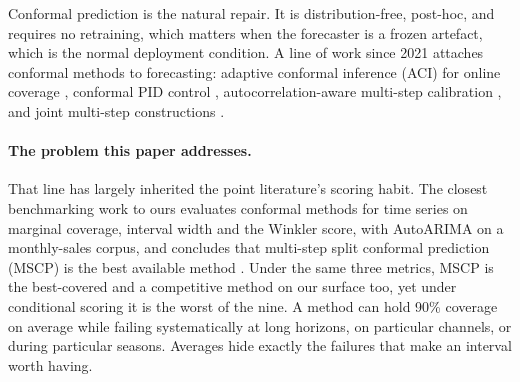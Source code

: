 \documentclass[11pt]{article}
\begin{document}
Conformal prediction is the natural repair. It is distribution-free, post-hoc, and requires no retraining, which matters when the forecaster is a frozen artefact, which is the normal deployment condition. A line of work since 2021 attaches conformal methods to forecasting: adaptive conformal inference (ACI) for online coverage \citep{aci,dtaci}, conformal PID control \citep{cpid}, autocorrelation-aware multi-step calibration \citep{acmcp}, and joint multi-step constructions \citep{cfrnn,bellman,copulacpts}.

\paragraph{The problem this paper addresses.} That line has largely inherited the point literature's scoring habit. The closest benchmarking work to ours evaluates conformal methods for time series on marginal coverage, interval width and the Winkler score, with AutoARIMA on a monthly-sales corpus, and concludes that multi-step split conformal prediction (MSCP) is the best available method \citep{cpsurvey}. Under the same three metrics, MSCP is the best-covered and a competitive method on our surface too, yet under conditional scoring it is the worst of the nine. A method can hold 90\% coverage on average while failing systematically at long horizons, on particular channels, or during particular seasons. Averages hide exactly the failures that make an interval worth having.
\end{document}
